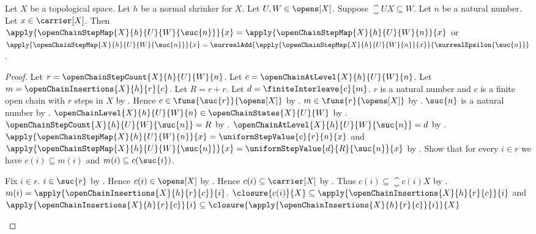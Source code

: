 \begin{theorem}\label{open_chain_step_map_successor_value}
    Let $X$ be a topological space.
    Let $h$ be a normal shrinker for $X$.
    Let $U,W\in\opens[X]$.
    Suppose $\closure{U}{X}\subseteq W$.
    Let $n$ be a natural number.
    Let $x\in\carrier[X]$.
    Then
        $\apply{\openChainStepMap{X}{h}{U}{W}{\suc{n}}}{x}
            =\apply{\openChainStepMap{X}{h}{U}{W}{n}}{x}$ or
        $\apply{\openChainStepMap{X}{h}{U}{W}{\suc{n}}}{x}
            =\surrealAdd{
                \apply{\openChainStepMap{X}{h}{U}{W}{n}}{x}}
                {\surrealEpsilon{\suc{n}}}$.
\end{theorem}
\begin{proof}
    Let $r=\openChainStepCount{X}{h}{U}{W}{n}$.
    Let $c=\openChainAtLevel{X}{h}{U}{W}{n}$.
    Let $m=\openChainInsertions{X}{h}{r}{c}$.
    Let $R=r+r$.
    Let $d=\finiteInterleave{c}{m}$.
    $r$ is a natural number and
        $c$ is a finite open chain with $r$ steps in $X$
        by .
    Hence $c\in\funs{\suc{r}}{\opens[X]}$
        by .
    $m\in\funs{r}{\opens[X]}$
        by .
    $\suc{n}$ is a natural number by .
    $\openChainLevel{X}{h}{U}{W}{n}
        \in\openChainStates{X}{U}{W}$
        by .
    $\openChainStepCount{X}{h}{U}{W}{\suc{n}}=R$
        by .
    $\openChainAtLevel{X}{h}{U}{W}{\suc{n}}=d$
        by
        .
    $\apply{\openChainStepMap{X}{h}{U}{W}{n}}{x}
        =\uniformStepValue{c}{r}{n}{x}$ and
        $\apply{\openChainStepMap{X}{h}{U}{W}{\suc{n}}}{x}
        =\uniformStepValue{d}{R}{\suc{n}}{x}$
        by .
    Show that for every $i\in r$ we have
        $c(i)\subseteq m(i)$ and $m(i)\subseteq c(\suc{i})$.
    \begin{subproof}
        Fix $i\in r$.
        $i\in\suc{r}$ by .
        Hence $c(i)\in\opens[X]$ by .
        Hence $c(i)\subseteq\carrier[X]$
            by .
        Thus $c(i)\subseteq\closure{c(i)}{X}$
            by .
        $m(i)=\apply{\openChainInsertions{X}{h}{r}{c}}{i}$.
        $\closure{c(i)}{X}
            \subseteq\apply{\openChainInsertions{X}{h}{r}{c}}{i}$ and
            $\apply{\openChainInsertions{X}{h}{r}{c}}{i}
            \subseteq\closure{
                \apply{\openChainInsertions{X}{h}{r}{c}}{i}}{X}$

\end{subproof}
\end{proof}
